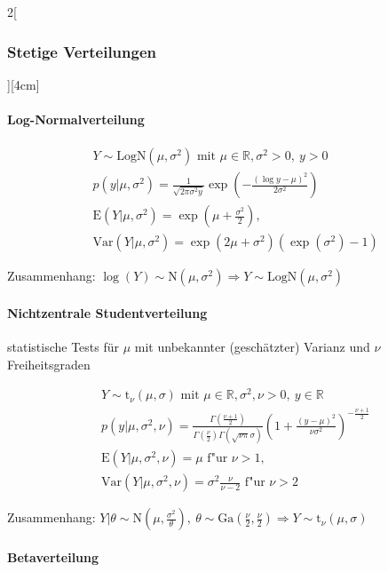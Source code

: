 \documentclass[8pt]{extarticle}
\begin{document}
\begin{multicols}{2}[\subsubsection{Stetige Verteilungen}][4cm]
    \paragraph{Log-Normalverteilung}
  
    \begin{align*}
    & Y \sim \mathrm{LogN}(\mu, \sigma^2) \text{ mit } \mu \in \mathbb{R}, \sigma^2 > 0,\: y > 0 \\
    & p(y|\mu, \sigma^2) =\frac{1}{\sqrt{2\pi\sigma^2 y}} \exp \left(-\frac{(\log y-\mu)^2}{2 \sigma^2} \right) \\
    & \mathrm{E}(Y|\mu, \sigma^2) = \exp (\mu + \frac{\sigma^2}{2}) ,\\
    & \mathrm{Var}(Y|\mu, \sigma^2) = \exp (2\mu + \sigma^2)(\exp (\sigma^2) - 1)
  \end{align*}
  
\noindent Zusammenhang: $\log (Y) \sim \mathrm{N}(\mu, \sigma^2) \Rightarrow Y \sim \mathrm{LogN}(\mu, \sigma^2)$
  
    \paragraph{Nichtzentrale Studentverteilung} statistische Tests für $\mu$ mit unbekannter (geschätzter) Varianz und $\nu$ Freiheitsgraden
  
    \begin{align*}
    & Y \sim \mathrm{t}_\nu(\mu, \sigma) \text{ mit } \mu \in \mathbb{R}, \sigma^2, \nu > 0,\: y \in \mathbb{R}\\
    & p(y|\mu, \sigma^2, \nu) =\frac{\Gamma \left( \frac{\nu + 1}{2}\right) }{\Gamma (\frac{\nu}{2}) \Gamma (\sqrt{\nu\pi}\sigma)} \left(1+ \frac{(y-\mu)^2}{\nu \sigma^2} \right)^{-\frac{\nu + 1}{2}} \\
    & \mathrm{E}(Y|\mu, \sigma^2, \nu) = \mu \text{ f"ur }  \nu > 1,\\
    & \mathrm{Var}(Y|\mu, \sigma^2, \nu) = \sigma^2 \frac{\nu}{\nu-2} \text{ f"ur }  \nu > 2
  \end{align*}
  
 \noindent Zusammenhang: $Y|\theta \sim \mathrm{N}(\mu, \frac{\sigma^2}{\theta}), \: \theta \sim  \mathrm{Ga}(\frac{\nu}{2}, \frac{\nu}{2}) \Rightarrow Y \sim \mathrm{t}_\nu(\mu, \sigma)$ 
  
	\paragraph{Betaverteilung}
  

\end{multicols}
\end{document}
